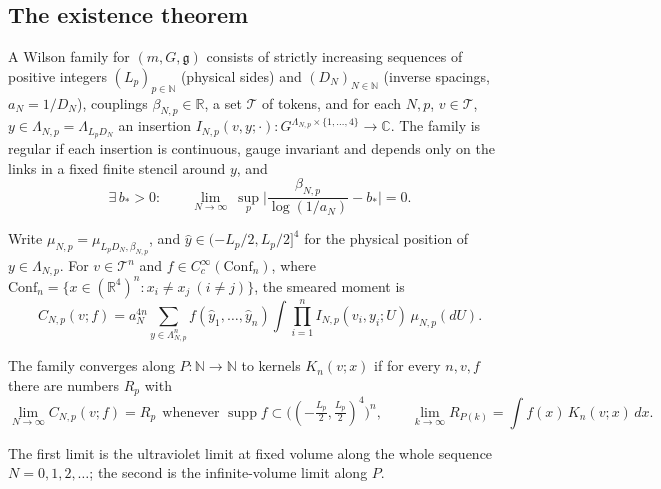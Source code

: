\subsection{The existence theorem}
\begin{definition}\label{ym:def:family}
A Wilson family for $(m,G,\mathfrak g)$ consists of strictly increasing
sequences of positive integers $(L_p)_{p\in\mathbb N}$ (physical sides) and
$(D_N)_{N\in\mathbb N}$ (inverse spacings, $a_N=1/D_N$), couplings
$\beta_{N,p}\in\mathbb R$, a set $\mathcal T$ of tokens, and for each
$N,p$, $v\in\mathcal T$, $y\in\Lambda_{N,p}=\Lambda_{L_pD_N}$ an insertion
$I_{N,p}(v,y;\cdot)\colon G^{\Lambda_{N,p}\times\{1,\dots,4\}}\to\mathbb C$.
The family is regular if each insertion is continuous, gauge invariant and
depends only on the links in a fixed finite stencil around $y$, and
\begin{equation}\label{ym:reg1}
 \exists\,b_*>0:\qquad
 \lim_{N\to\infty}\ \sup_{p}\Big|\frac{\beta_{N,p}}{\log(1/a_N)}-b_*\Big|=0 .
\end{equation}
\end{definition}
Write $\mu_{N,p}=\mu_{L_pD_N,\beta_{N,p}}$, and $\hat y\in(-L_p/2,L_p/2]^4$
for the physical position of $y\in\Lambda_{N,p}$. For $v\in\mathcal T^n$ and
$f\in C_c^\infty(\mathrm{Conf}_n)$, where $\mathrm{Conf}_n=\{x\in(\mathbb
R^4)^n: x_i\ne x_j\ (i\ne j)\}$, the smeared moment is
\begin{equation}\label{ym:smeared-moment}
 C_{N,p}(v;f)=a_N^{4n}\sum_{y\in\Lambda_{N,p}^n}f(\hat y_1,\dots,\hat y_n)
 \int\prod_{i=1}^nI_{N,p}(v_i,y_i;U)\,\mu_{N,p}(dU).
\end{equation}
\begin{definition}\label{ym:def:ordered}
The family converges along $P\colon\mathbb N\to\mathbb N$ to kernels $K_n(v;x)$
if for every $n,v,f$ there are numbers $R_p$ with
\begin{equation}\label{ym:ordered-limit}
 \lim_{N\to\infty}C_{N,p}(v;f)=R_p\ \ \text{whenever }
 \operatorname{supp}f\subset\big((-\tfrac{L_p}{2},\tfrac{L_p}{2})^4\big)^n,
 \qquad
 \lim_{k\to\infty}R_{P(k)}=\int f(x)\,K_n(v;x)\,dx .
\end{equation}
\end{definition}
The first limit is the ultraviolet limit at fixed volume along the whole
sequence $N=0,1,2,\dots$; the second is the infinite-volume limit along $P$.

